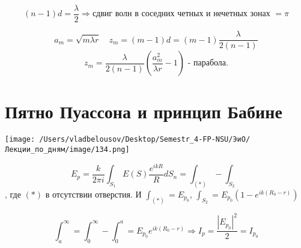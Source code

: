 \documentclass[12pt, a4paper]{report}
\begin{document}
\[ (n-1 ) d = \frac{\lambda}{2 } \Rightarrow \text{сдвиг волн в соседних четных и нечетных зонах }= \pi   \] 

\[ a_m = \sqrt{ m \lambda r} \quad  z_m = (m-1 ) d = (m-1 ) \frac{\lambda}{2 (n-1)}   \] 
\[ z_m = \frac{\lambda}{2(n-1)}\left( \frac{a_m ^2 }{ \lambda r }- 1  \right) \text{ - парабола.}   \] 

\section{Пятно Пуассона и принцип Бабине }

\begin{center}
    \texttt{[image: /Users/vladbelousov/Desktop/Semestr\_4-FP-NSU/ЭиО/Лекции\_по\_дням/image/134.png]}
\end{center}

\[ E_p = \frac{k}{2 \pi i } \int_{S_1} E(S) \frac{e^{i kR } }{R} d S_n = \int_{(*)}- \int_{S_2}   \] 
, где \( (*) \) в отсутствии отверстия. И \( \displaystyle \int_{(*)} = E_{p _0}   \), \( \displaystyle \int_{S_2} = E_{p _0} (1- e^{i k (R_0 -r)} )  \) 

\[ \int_{a }^{\infty  }= \int_{0 }^{\infty  }- \int_{0 }^{a} = E_{p_0} e^{ i k (R_0 -r)} \Rightarrow I_p = \frac{|E_{p_0} | ^2 }{2} = I_{p_0}       \] 

\ifdefined\mainfile
\else
    
\end{document}
